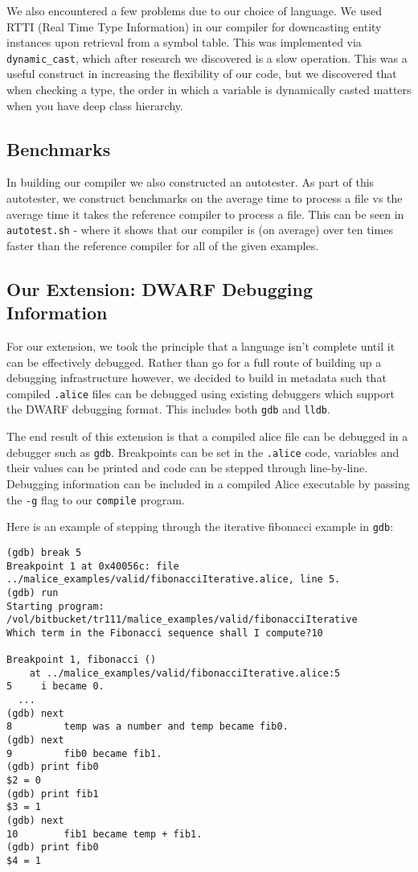 \documentclass[a4wide, 11pt]{article}
\begin{document}
We also encountered a few problems due to our choice of language. We used RTTI (Real Time Type Information) in our compiler for downcasting entity instances upon retrieval from a symbol table. This was implemented via \texttt{dynamic\_cast}, which after research we discovered is a slow operation. This was a useful construct in increasing the flexibility of our code, but we discovered that when checking a type, the order in which a variable is dynamically casted matters when you have deep class hierarchy.

\subsection{Benchmarks}

In building our compiler we also constructed an autotester. As part of this autotester, we construct benchmarks on the average time to process a file vs the average time it takes the reference compiler to process a file. This can be seen in \texttt{autotest.sh} - where it shows that our compiler is (on average) over ten times faster than the reference compiler for all of the given examples.

\subsection{Our Extension: DWARF Debugging Information}

For our extension, we took the principle that a language isn't complete until it can be effectively debugged. Rather than go for a full route of building up a debugging infrastructure however, we decided to build in metadata such that compiled \texttt{.alice} files can be debugged using existing debuggers which support the DWARF debugging format. This includes both \texttt{gdb} and \texttt{lldb}.

The end result of this extension is that a compiled alice file can be debugged in a debugger such as \texttt{gdb}. Breakpoints can be set in the \texttt{.alice} code, variables and their values can be printed and code can be stepped through line-by-line. Debugging information can be included in a compiled Alice executable by passing the \texttt{-g} flag to our \texttt{compile} program.

Here is an example of stepping through the iterative fibonacci example in \texttt{gdb}:

\begin{verbatim}
(gdb) break 5
Breakpoint 1 at 0x40056c: file ../malice_examples/valid/fibonacciIterative.alice, line 5.
(gdb) run
Starting program: /vol/bitbucket/tr111/malice_examples/valid/fibonacciIterative 
Which term in the Fibonacci sequence shall I compute?10

Breakpoint 1, fibonacci ()
    at ../malice_examples/valid/fibonacciIterative.alice:5
5     i became 0.
  ...
(gdb) next
8         temp was a number and temp became fib0.
(gdb) next
9         fib0 became fib1.
(gdb) print fib0
$2 = 0
(gdb) print fib1
$3 = 1
(gdb) next
10        fib1 became temp + fib1.
(gdb) print fib0
$4 = 1
\end{verbatim}
\end{document}
